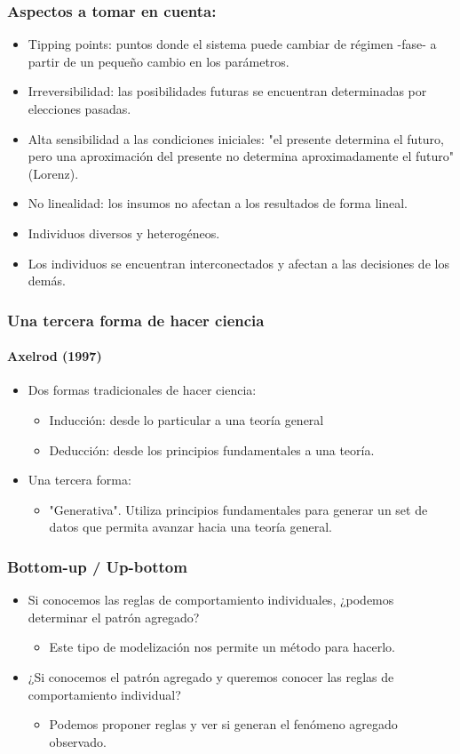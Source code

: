 \documentclass[11pt]{beamer}
\begin{document}
\begin{frame}
\frametitle{Aspectos a tomar en cuenta:}
\begin{itemize}
	\item Tipping points: puntos donde el sistema puede cambiar de régimen -fase- a partir de un pequeño cambio en los parámetros.
	\item Irreversibilidad: las posibilidades futuras se encuentran determinadas por elecciones pasadas.
	\item Alta sensibilidad a las condiciones iniciales: "el presente determina el futuro, pero una aproximación del presente no determina aproximadamente el futuro" (Lorenz).
	\item No linealidad: los insumos no afectan a los resultados de forma lineal.
	\item Individuos diversos y heterogéneos.
	\item Los individuos se encuentran interconectados y afectan a las decisiones de los demás.
\end{itemize}
\end{frame}

\begin{frame}
\frametitle{Una tercera forma de hacer ciencia}
\framesubtitle{Axelrod (1997)}
\begin{itemize}
	\item Dos formas tradicionales de hacer ciencia: 
	\begin{itemize}
		\item Inducción: desde lo particular a una teoría general
		\item Deducción: desde los principios fundamentales a una teoría.
	\end{itemize}
	\item Una tercera forma:
	\begin{itemize}
		\item "Generativa". Utiliza principios fundamentales para generar un set de datos que permita avanzar hacia una teoría general.
	\end{itemize}
\end{itemize}
\end{frame}

\begin{frame}
\frametitle{Bottom-up / Up-bottom}
\begin{itemize}
	\item Si conocemos las reglas de comportamiento individuales, ¿podemos determinar el patrón agregado?
	\begin{itemize}
		\item Este tipo de modelización nos permite un método para hacerlo.
	\end{itemize}
  	\item ¿Si conocemos el patrón agregado y queremos conocer las reglas de comportamiento individual? 
 	\begin{itemize}
 		\item Podemos proponer reglas y ver si generan el fenómeno agregado observado.
 	\end{itemize}
\end{itemize}
\end{frame}
\end{document}
